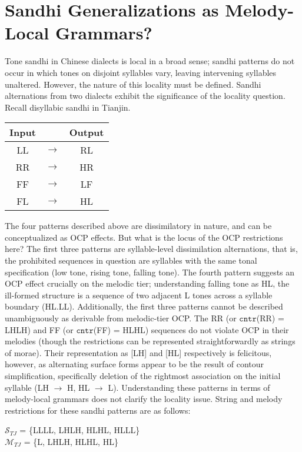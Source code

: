 \documentclass{article}
\begin{document}
\section{Sandhi Generalizations as Melody-Local Grammars?}
Tone sandhi in Chinese dialects is local in a broad sense; sandhi patterns do not occur in which tones on disjoint syllables vary, leaving intervening syllables unaltered. However, the nature of this locality must be defined. Sandhi alternations from two dialects exhibit the significance of the locality question.
Recall disyllabic sandhi in Tianjin.
\begin{exe}
\ex
\label{x:Tianjin1}
\begin{tabular}[t]{ccc}
 Input && Output \\
 \hline
LL & $\rightarrow$ & RL \\
RR & $\rightarrow$ & HR \\
FF & $\rightarrow$ & LF \\
FL & $\rightarrow$ & HL \\
\end{tabular}
\end{exe}
The four patterns described above are dissimilatory in nature, and can be conceptualized as OCP effects. But what is the locus of the OCP restrictions here? The first three patterns are syllable-level dissimilation alternations, that is, the prohibited sequences in question are syllables with the same tonal specification (low tone, rising tone, falling tone). The fourth pattern suggests an OCP effect crucially on the melodic tier; understanding falling tone as HL, the ill-formed structure is a sequence of two adjacent L tones across a syllable boundary (HL.LL). 
Additionally, the first three patterns cannot be described unambiguously as derivable from melodic-tier OCP. The RR (or $\mathtt{cntr}$(RR) = LHLH) and FF (or $\mathtt{cntr}$(FF) = HLHL) sequences do not violate OCP in their melodies (though the restrictions can be represented straightforwardly as strings of morae). Their representation as [LH] and [HL] respectively is felicitous, however, as alternating surface forms appear to be the result of contour simplification, specifically deletion of the rightmost association on the initial syllable (LH $\rightarrow$ H, HL $\rightarrow$ L).
Understanding these patterns in terms of melody-local grammars does not clarify the locality issue. String and melody restrictions for these sandhi patterns are as follows:
\begin{exe}
\ex
$\mathcal{S}_{TJ}$ = \{LLLL, LHLH, HLHL, HLLL\} \\
$\mathcal{M}_{TJ}$ = \{L, LHLH, HLHL, HL\}
\end{exe}
\end{document}
